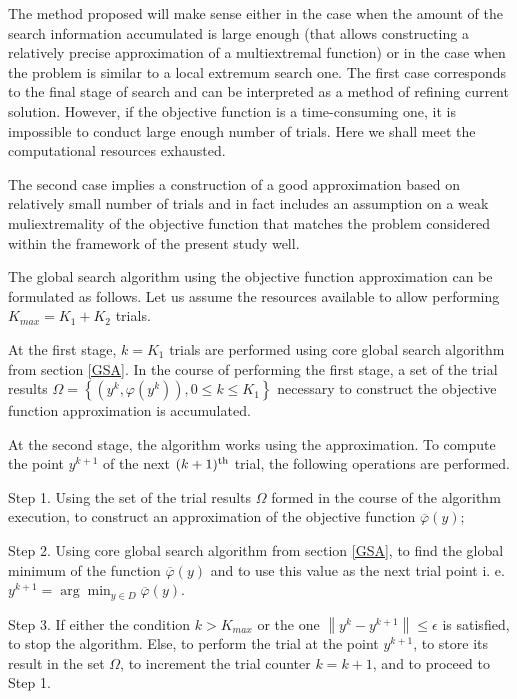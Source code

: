 \documentclass[sensors,article,submit,moreauthors,pdftex]{Definitions/mdpi}
\begin{document}
The method proposed will make sense either in the case when the amount of the search information accumulated is large enough (that allows constructing a relatively precise approximation of a multiextremal function) or in the case when the problem is similar to a local extremum search one.
The first case corresponds to the final stage of search and can be interpreted as a method of refining current solution. However, if the objective function is a time-consuming one, it is impossible to conduct large enough number of trials. Here we shall meet the computational resources exhausted.

The second case implies a construction of a good approximation based on relatively small number of trials and in fact includes an assumption on a weak muliextremality of the objective function that matches the problem considered within the framework of the present study well.
 
The global search algorithm using the objective function approximation can be formulated as follows.
Let us assume the resources available to allow performing $K_{max} = K_1 + K_2$ trials.

At the first stage, $k = K_1$ trials are performed using core global search algorithm from section \ref{GSA}.
In the course of performing the first stage, a set of the trial results $\Omega = \left\{(y^k, \varphi(y^k)), 0\leq k\leq K_1\right\}$ necessary to construct the objective function approximation is accumulated.

At the second stage, the algorithm works using the approximation. To compute the point $y^{k+1}$ of the next $(k+1)^{\rm th}$ trial, the following operations are performed.

Step 1. Using the set of the trial results $\Omega$ formed in the course of the algorithm execution, to construct an approximation of the objective function $\overline{\varphi}(y)$;

Step 2. Using core global search algorithm from section \ref{GSA}, to find the global minimum of the function $\overline{\varphi}(y)$ and to use this value as the next trial point i. e. $y^{k+1} = \arg \min_{y \in D} \overline{\varphi}(y)$.

Step 3. If either the condition $k>K_{max}$ or the one $\left\|y^k - y^{k+1}\right\| \leq \epsilon$ is satisfied, to stop the algorithm.
Else, to perform the trial at the point $y^{k+1}$, to store its result in the set $\Omega$, to increment the trial counter $k = k+1$, and to proceed to Step 1.
\end{document}
